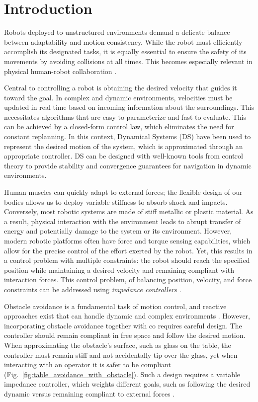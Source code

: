 \section{Introduction}
Robots deployed to unstructured environments demand a delicate balance between adaptability and motion consistency. While the robot must efficiently accomplish its designated tasks, it is equally essential to ensure the safety of its movements by avoiding collisions at all times. This becomes especially relevant in physical human-robot collaboration \parencite{ajoudani2018progress}.

Central to controlling a robot is obtaining the desired velocity that guides it toward the goal. In complex and dynamic environments, velocities must be updated in real time based on incoming information about the surroundings. This necessitates algorithms that are easy to parameterize and fast to evaluate. 
This can be achieved by a closed-form control law, which eliminates the need for constant replanning. In this context, Dynamical Systems (DS) have been used to represent the desired motion of the system, which is approximated through an appropriate controller. DS can be designed with well-known tools from control theory to provide stability and convergence guarantees for navigation in dynamic environments.

Human muscles can quickly adapt to external forces; the flexible design of our bodies allows us to deploy variable stiffness to absorb shock and impacts. 
Conversely, most robotic systems are made of stiff metallic or plastic material. 
As a result, physical interaction with the environment leads to abrupt transfer of energy and potentially damage to the system or its environment. However, modern robotic platforms often have force and torque sensing capabilities, which allow for the precise control of the effort exerted by the robot.
Yet, this results in a control problem with multiple constraints: the robot should reach the specified position while maintaining a desired velocity and remaining compliant with interaction forces. This control problem, of balancing position, velocity, and force constraints can be addressed using \textit{impedance controllers} \parencite{takegaki1981new, hogan1985impedance}.

Obstacle avoidance is a fundamental task of motion control, and reactive approaches exist that can handle dynamic and complex environments \parencite{huber2022avoiding}. 
However, incorporating obstacle avoidance together with co requires careful design. The controller should remain compliant in free space and follow the desired motion. When approximating the obstacle's surface, such as glass on the table, the controller must remain stiff and not accidentally tip over the glass, yet when interacting with an operator it is safer to be compliant (Fig.~\ref{fig:table_avoidance_with_obstacle}). 
Such a design requires a variable impedance controller, which weights different goals, such as following the desired dynamic versus remaining compliant to external forces \parencite{kronander2015passive}. 

